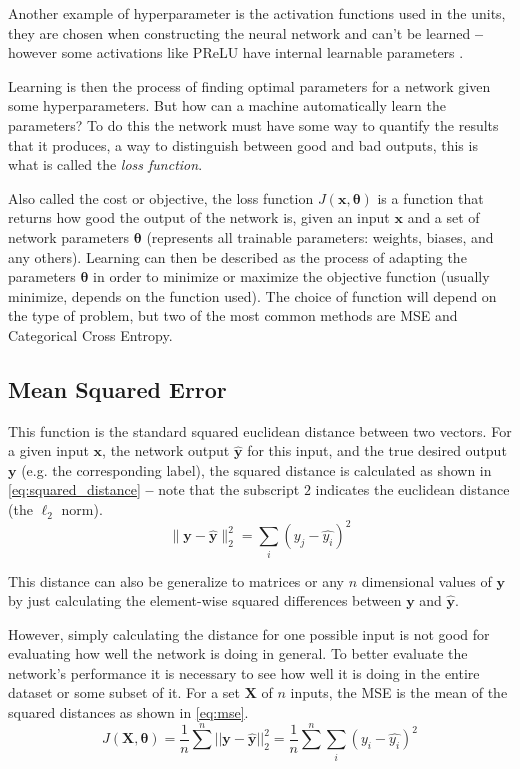 Another example of hyperparameter is the activation functions used in the units, they are chosen when constructing the neural network and can't be learned \textbf{--} however some activations like PReLU have internal learnable parameters \cite{prelu2015}.

Learning is then the process of finding optimal parameters for a network given some hyperparameters. But how can a machine automatically learn the parameters? To do this the network must have some way to quantify the results that it produces, a way to distinguish between good and bad outputs, this is what is called the \textit{loss function}.

Also called the cost or objective, the loss function $J(\bm{x}, \bm{\theta})$ is a function that returns how good the output of the network is, given an input $\bm{x}$ and a set of network parameters $\bm{\theta}$ (represents all trainable parameters: weights, biases, and any others). Learning can then be described as the process of adapting the parameters $\bm{\theta}$ in order to minimize or maximize the objective function (usually minimize, depends on the function used). The choice of function will depend on the type of problem, but two of the most common methods are \gls{MSE} and Categorical Cross Entropy.

\subsection{Mean Squared Error} \label{sub:mse}
This function is the standard squared euclidean distance between two vectors. For a given input $\bm{x}$, the network output $\hat{\bm{y}}$ for this input, and the true desired output $\bm{y}$ (e.g. the corresponding label), the squared distance is calculated as shown in \autoref{eq:squared_distance} \textbf{--} note that the subscript $2$ indicates the euclidean distance (the $\ell_2$ norm).
\begin{equation} \label{eq:squared_distance}
    \| \bm{y} - \hat{\bm{y}} \|_{2}^{2} = \sum_{i}{(y_j - \hat{y_i})^2}
\end{equation}

This distance can also be generalize to matrices or any $n$ dimensional values of $\bm{y}$ by just calculating the element-wise squared differences between $\bm{y}$ and $\hat{\bm{y}}$.

However, simply calculating the distance for one possible input is not good for evaluating how well the network is doing in general. To better evaluate the network's performance it is necessary to see how well it is doing in the entire dataset or some subset of it. For a set $\bm{X}$ of $n$ inputs, the \gls{MSE} is the mean of the squared distances as shown in \autoref{eq:mse}.
\begin{equation} \label{eq:mse}
    J(\bm{X}, \bm{\theta}) = \frac{1}{n}\sum^{n}||\bm{y} - \hat{\bm{y}}||_{2}^{2} = \frac{1}{n}\sum^{n}\sum_{i}{(y_i - \hat{y_i})^2}
\end{equation}

